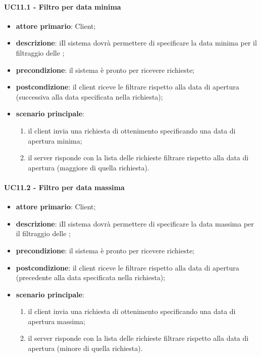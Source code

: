 \paragraph{UC11.1 - Filtro per data minima}
\begin{itemize}
	\item \textbf{attore primario}: Client;
	\item \textbf{descrizione}: iIl sistema dovrà permettere di specificare la data minima per il filtraggio delle ;
	\item \textbf{precondizione}:  il sistema è pronto per ricevere richieste;
	\item \textbf{postcondizione}: il client riceve le  filtrare rispetto alla data di apertura (successiva alla data specificata nella richiesta);
	\item \textbf{scenario principale}: 
	\begin{enumerate}
		\item  il client invia una richiesta di ottenimento  specificando una data di apertura minima;
		\item  il server risponde con la lista delle  richieste filtrare rispetto alla data di apertura (maggiore di quella richiesta).
	\end{enumerate}
\end{itemize}
\paragraph{UC11.2 - Filtro per data massima}
\begin{itemize}
	\item \textbf{attore primario}: Client;
	\item \textbf{descrizione}: iIl sistema dovrà permettere di specificare la data massima per il filtraggio delle ;
	\item \textbf{precondizione}:  il sistema è pronto per ricevere richieste;
	\item \textbf{postcondizione}: il client riceve le  filtrare rispetto alla data di apertura (precedente alla data specificata nella richiesta);
	\item \textbf{scenario principale}: 
	\begin{enumerate}
		\item  il client invia una richiesta di ottenimento  specificando una data di apertura massima;
		\item  il server risponde con la lista delle  richieste filtrare rispetto alla data di apertura (minore di quella richiesta).
	\end{enumerate}
\end{itemize}
